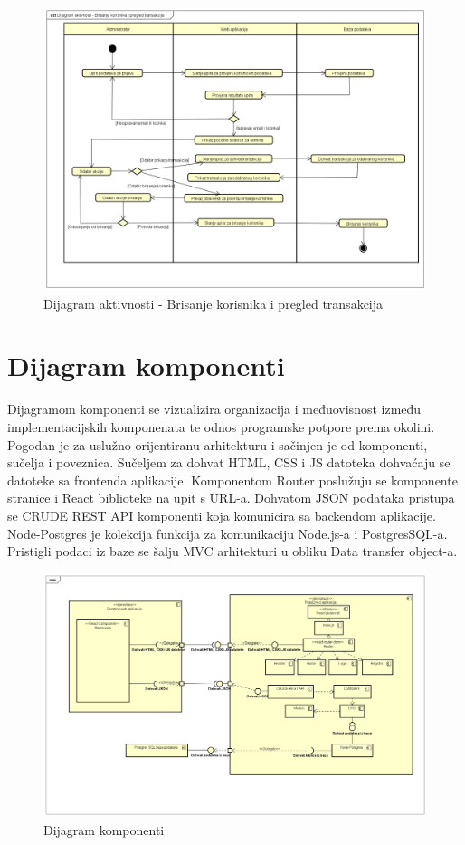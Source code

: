 				\begin{figure}[H]
					\centering
					\includegraphics[width=1\linewidth]{"slike/actDiagram2.png"}
					\caption{Dijagram aktivnosti - Brisanje korisnika i pregled transakcija}
					\label{fig:dij-akt-drugi}
				\end{figure}
			
			\eject

\section{Dijagram komponenti}
			{Dijagramom komponenti se vizualizira organizacija i međuovisnost između implementacijskih komponenata te odnos programske potpore prema okolini. Pogodan je za uslužno-orijentiranu arhitekturu i sačinjen je od komponenti, sučelja i poveznica. Sučeljem za dohvat HTML, CSS i JS datoteka dohvaćaju se datoteke sa frontenda aplikacije. Komponentom Router poslužuju se komponente stranice i React biblioteke na upit s URL-a. Dohvatom JSON podataka pristupa se CRUDE REST API komponenti koja komunicira sa backendom aplikacije. Node-Postgres je kolekcija funkcija za komunikaciju Node.js-a i PostgresSQL-a. Pristigli podaci iz baze se šalju MVC arhitekturi u obliku Data transfer object-a.} 
			
				\begin{figure}[H]
					\centering
					\includegraphics[width=1\linewidth]{"slike/ComponentDiagram.png"}
					\caption{Dijagram komponenti}
					\label{fig:dij-komponenti}
				\end{figure}
			
			
			\eject 
		